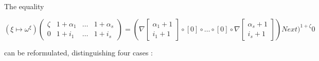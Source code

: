 \documentclass[10pt]{article}
\begin{document}
\bigskip

The equality

\( (\xi \mapsto \omega^\xi) \begin{pmatrix} \zeta & 1+\alpha_1 & \ldots & 1+\alpha_s \\
                                            0     & 1+i_1      & \ldots & 1+i_s      \end{pmatrix} 
 = (\nabla \begin{bmatrix} \alpha_1+1 \\
                             i_1+1      \end{bmatrix} \circ [0] \circ \ldots \circ [0] \circ \nabla \begin{bmatrix} \alpha_s+1 \\
                                                                                                                    i_s+1      \end{bmatrix}) Next)^{1+\zeta} 0 \)

can be reformulated, distinguishing four cases :
\end{document}
